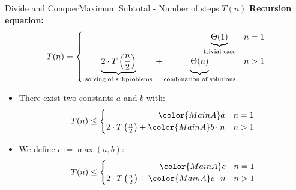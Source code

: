 



\begin{frame}{Divide and Conquer}{Maximum Subtotal - Number of steps $T(n)$}
  \textbf{Recursion equation:} 
  \begin{displaymath}
    T(n) = \begin{cases}
      \hfill \underbrace{\Theta(1)}_\text{trivial case} & n = 1\\
      \underbrace{2 \cdot T\left(\frac{n}{2}\right)}_\text{
        solving of subproblems
      } + \underbrace{
        \Theta(n)
        \vphantom{\left(\frac{n}{2}\right)}
      }_\text{combination of solutions} & n > 1
    \end{cases}
  \end{displaymath}
    \begin{itemize}
    \item<2->
      There exist two constants {\color{MainA}$a$} and {\color{MainA}$b$} with:
      \begin{displaymath}
        T(n) \leq \begin{cases}
          \hfill {\color{MainA}a} & n = 1\\
          2 \cdot T\left(\frac{n}{2}\right) + {\color{MainA}b} \cdot n & n > 1
        \end{cases}
      \end{displaymath}
    \item<3->
      We define {\color{MainA}$c := \max(a,b)$}:
      \begin{displaymath}
        T(n) \leq \begin{cases}
          \hfill {\color{MainA}c} & n = 1\\
          2 \cdot T\left(\frac{n}{2}\right) + {\color{MainA}c} \cdot n & n > 1
        \end{cases}
      \end{displaymath}
  \end{itemize}
\end{frame}

